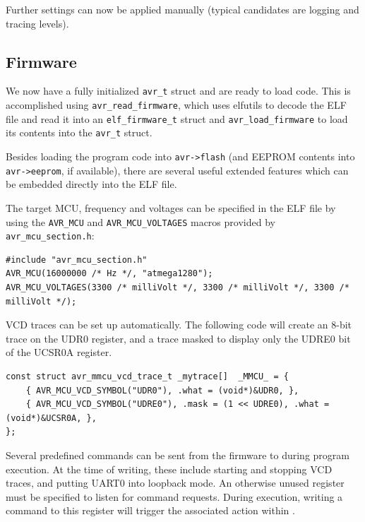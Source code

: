 Further settings can now be applied manually (typical candidates are logging and
tracing levels).

\subsection{Firmware} \label{subsection:initialization_firmware}

We now have a fully initialized \lstinline|avr_t| struct and are ready to load
code. This is accomplished using \lstinline|avr_read_firmware|, which uses
elfutils to decode the \ac{ELF} file and read it into an \lstinline|elf_firmware_t|
struct and \lstinline|avr_load_firmware| to load its contents into the
\lstinline|avr_t| struct.

Besides loading the program code into \lstinline|avr->flash| (and \ac{EEPROM} contents
into \lstinline|avr->eeprom|, if available), there are several useful extended
features which can be embedded directly into the \ac{ELF} file.

The target \ac{MCU}, frequency and voltages can be specified in the \ac{ELF} file by using the
\lstinline|AVR_MCU| and \lstinline|AVR_MCU_VOLTAGES| macros provided by
\verb|avr_mcu_section.h|:

\begin{lstlisting}
#include "avr_mcu_section.h"
AVR_MCU(16000000 /* Hz */, "atmega1280");
AVR_MCU_VOLTAGES(3300 /* milliVolt */, 3300 /* milliVolt */, 3300 /* milliVolt */);
\end{lstlisting}

\ac{VCD} traces can be set up automatically. The following code will create an 8-bit
trace on the UDR0 register, and a trace masked to display only the UDRE0 bit of
the UCSR0A register.

\begin{lstlisting}
const struct avr_mmcu_vcd_trace_t _mytrace[]  _MMCU_ = {
    { AVR_MCU_VCD_SYMBOL("UDR0"), .what = (void*)&UDR0, },
    { AVR_MCU_VCD_SYMBOL("UDRE0"), .mask = (1 << UDRE0), .what = (void*)&UCSR0A, },
};
\end{lstlisting}

Several predefined commands can be sent from the firmware to \simavr during program execution.
At the time of writing, these include starting and stopping \ac{VCD} traces, and putting
UART0 into loopback mode. An otherwise unused register must be specified
to listen for command requests. During execution, writing a command to this
register will trigger the associated action within \simavr.

